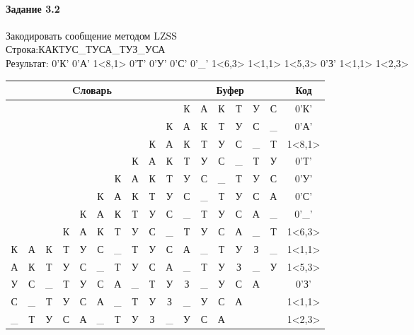 \documentclass[a4paper, 12pt]{article}
\begin{document}
\paragraph{Задание 3.2}

Закодировать сообщение методом LZSS\\
Строка:КАКТУС\_ТУСА\_ТУЗ\_УСА\\
Результат: 0'К' 0'А' 1<8,1> 0'Т' 0'У' 0'С' 0'\_' 1<6,3> 1<1,1> 1<5,3> 0'З' 1<1,1> 1<2,3>\\
\begin{table}[h!]
\centering
\begin{tabular}{|c|c|c|c|c|c|c|c|c|c|c|c|c|c|c|c|c|}
\hline
\multicolumn{10}{|c|}{Cловарь} & \multicolumn{6}{c|}{Буфер} & Код  \\ \hline
  &   &   &   &   &   &   &   &   &   & К & А & К & Т & У & С & 0'К'\\ \hline
  &   &   &   &   &   &   &   &   & К & А & К & Т & У & С & \_ & 0'А'\\ \hline
  &   &   &   &   &   &   &   & \cellcolor[HTML]{FFFF00} К & А & \cellcolor[HTML]{FFFF00} К & Т & У & С & \_ & Т & 1<8,1>\\ \hline
  &   &   &   &   &   &   & К & А & К & Т & У & С & \_ & Т & У & 0'Т'\\ \hline
  &   &   &   &   &   & К & А & К & Т & У & С & \_ & Т & У & С & 0'У'\\ \hline
  &   &   &   &   & К & А & К & Т & У & С & \_ & Т & У & С & А & 0'С'\\ \hline
  &   &   &   & К & А & К & Т & У & С & \_ & Т & У & С & А & \_ & 0'\_'\\ \hline
  &   &   & К & А & К & \cellcolor[HTML]{FFFF00} Т & \cellcolor[HTML]{FFFF00} У & \cellcolor[HTML]{FFFF00} С & \_ & \cellcolor[HTML]{FFFF00} Т & \cellcolor[HTML]{FFFF00} У & \cellcolor[HTML]{FFFF00} С & А & \_ & Т & 1<6,3>\\ \hline
К & \cellcolor[HTML]{FFFF00} А & К & Т & У & С & \_ & Т & У & С & \cellcolor[HTML]{FFFF00} А & \_ & Т & У & З & \_ & 1<1,1>\\ \hline
А & К & Т & У & С & \cellcolor[HTML]{FFFF00} \_ & \cellcolor[HTML]{FFFF00} Т & \cellcolor[HTML]{FFFF00} У & С & А & \cellcolor[HTML]{FFFF00} \_ & \cellcolor[HTML]{FFFF00} Т & \cellcolor[HTML]{FFFF00} У & З & \_ & У & 1<5,3>\\ \hline
У & С & \_ & Т & У & С & А & \_ & Т & У & З & \_ & У & С & А &   & 0'З'\\ \hline
С & \cellcolor[HTML]{FFFF00} \_ & Т & У & С & А & \_ & Т & У & З & \cellcolor[HTML]{FFFF00} \_ & У & С & А &   &   & 1<1,1>\\ \hline
\_ & Т & \cellcolor[HTML]{FFFF00} У & \cellcolor[HTML]{FFFF00} С & \cellcolor[HTML]{FFFF00} А & \_ & Т & У & З & \_ & \cellcolor[HTML]{FFFF00} У & \cellcolor[HTML]{FFFF00} С & \cellcolor[HTML]{FFFF00} А &   &   &   & 1<2,3>\\ \hline
\end{tabular}
\end{table}
\end{document}
